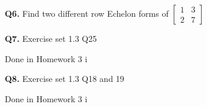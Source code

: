 \documentclass[addpoints]{exam}
\begin{document}
\begin{sloppypar}
\begin{questions}
\begin{solution}
    \end{solution}

    \question
    \textbf{Q6. } Find two different row Echelon forms of $ \begin{bmatrix}
        1 & 3 \\ 2 & 7
    \end{bmatrix} $ 
    \begin{solution}
        
    \end{solution}

    \question
    \textbf{Q7. } Exercise set 1.3 Q25
    \begin{solution}
        Done in Homework 3 i
    \end{solution}

    \question
    \textbf{Q8. } Exercise set 1.3 Q18 and 19
    \begin{solution}
        Done in Homework 3 i
    \end{solution}

\end{questions}
\end{sloppypar}
\end{document}
